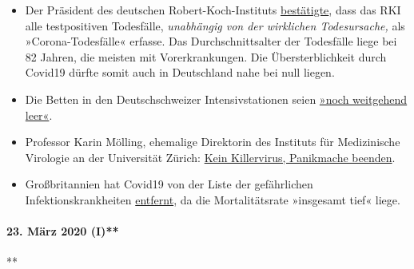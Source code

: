 \begin{itemize}
\tightlist
\item
  Der Präsident des deutschen Robert-Koch-Instituts
  \href{https://swprs.org/rki-relativiert-corona-todesfaelle/}{bestätigte},
  dass das RKI alle testpositiven Todesfälle, \emph{unabhängig von der
  wirklichen Todesursache,} als »Corona-Todesfälle« erfasse. Das
  Durch­schnitts­alter der Todesfälle liege bei 82 Jahren, die meisten
  mit Vorerkrankungen. Die Übersterblichkeit durch Covid19 dürfte somit
  auch in Deutschland nahe bei null liegen.
\item
  Die Betten in den Deutschschweizer Intensivstationen seien
  \href{https://www.aargauerzeitung.ch/aargau/kanton-aargau/erst-3-von-100-aargauer-betten-der-intensivstationen-sind-belegt-so-ruesten-sich-die-spitaeler-auf-die-epidemie-137332716}{»noch
  weitgehend leer«}.
\item
  Professor Karin Mölling, ehemalige Direktorin des Instituts für
  Medizinische Virologie an der Universität Zürich:
  \href{https://www.radioeins.de/programm/sendungen/die_profis/archivierte_sendungen/beitraege/corona-virus-kein-killervirus.html}{Kein
  Killervirus, Panikmache beenden}.
\item
  Großbritannien hat Covid19 von der Liste der gefährlichen
  Infektionskrankheiten
  \href{https://www.gov.uk/guidance/high-consequence-infectious-diseases-hcid\#status-of-covid-19}{entfernt},
  da die Mortalitätsrate »insgesamt tief« liege.
\end{itemize}

\hypertarget{23-muxe4rz-2020-i}{%
\paragraph{23. März 2020 (I)**}\label{23-muxe4rz-2020-i}}

**

